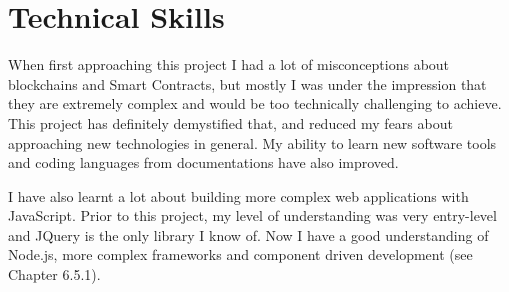 \section{Technical Skills}

When first approaching this project I had a lot of misconceptions about blockchains and Smart Contracts, 
but mostly I was under the impression that they are extremely complex and would be too technically challenging to achieve. 
This project has definitely demystified that, and reduced my fears about approaching new technologies in general.
My ability to learn new software tools and coding languages from documentations have also improved.

I have also learnt a lot about building more complex web applications with JavaScript. Prior to this project, 
my level of understanding was very entry-level and JQuery is the only library I know of. Now I have a good understanding of
Node.js, more complex frameworks and component driven development (see Chapter 6.5.1).